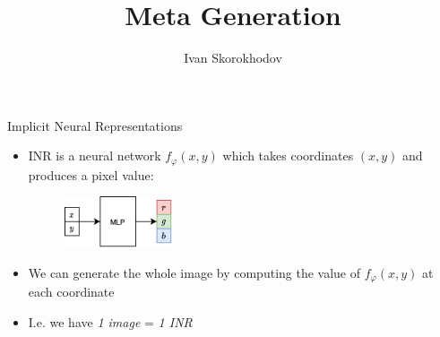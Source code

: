 \documentclass[10pt, handout]{beamer}
\title{Meta Generation}
\author{Ivan Skorokhodov}
\begin{document}
\begin{frame}
    \titlepage
\end{frame}


\begin{frame}{Implicit Neural Representations}
\begin{itemize}
    \item\pause INR is a neural network $f_\varphi(x,y)$ which takes coordinates $(x,y)$ and produces a pixel value:
    \begin{figure}
        \centering
        \includegraphics[width=0.3\textwidth]{images/inr}
    \end{figure}
    \item\pause We can generate the whole image by computing the value of $f_\varphi(x,y)$ at each coordinate
    \item\pause I.e. we have \textit{1 image} = \textit{1 INR}
\end{itemize}
\end{frame}
\end{document}
